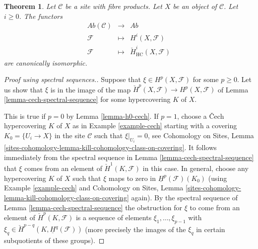 \documentclass{stacks-project}
\theoremstyle{plain}
\newtheorem{theorem}[subsection]{Theorem}
\theoremstyle{definition}
\theoremstyle{remark}
\numberwithin{equation}{subsection}
\begin{document}
\begin{theorem}
\label{theorem-cohomology-hypercoverings}
Let $\mathcal{C}$ be a site with fibre products.
Let $X$ be an object of $\mathcal{C}$. Let $i \geq 0$.
The functors
\begin{eqnarray*}
\textit{Ab}(\mathcal{C}) & \longrightarrow & \textit{Ab} \\
\mathcal{F} & \longmapsto & H^i(X, \mathcal{F}) \\
\mathcal{F} & \longmapsto & \check{H}^i_{\text{HC}}(X, \mathcal{F})
\end{eqnarray*}
are canonically isomorphic.
\end{theorem}

\begin{proof}[Proof using spectral sequences.]
Suppose that $\xi \in H^p(X, \mathcal{F})$ for some $p \geq 0$.
Let us show that $\xi$ is in the image of the map
$\check{H}^p(X, \mathcal{F}) \to H^p(X, \mathcal{F})$ of
Lemma \ref{lemma-cech-spectral-sequence}
for some hypercovering $K$ of $X$.

\medskip\noindent
This is true if $p = 0$ by Lemma \ref{lemma-h0-cech}.
If $p = 1$, choose a {\v C}ech hypercovering $K$ of $X$ as in
Example \ref{example-cech} starting with a covering
$K_0 = \{U_i \to X\}$ in the site $\mathcal{C}$ such that
$\xi|_{U_i} = 0$, see
Cohomology on Sites,
Lemma \ref{sites-cohomology-lemma-kill-cohomology-class-on-covering}.
It follows immediately from the spectral sequence
in Lemma \ref{lemma-cech-spectral-sequence} that $\xi$ comes
from an element of $\check{H}^1(K, \mathcal{F})$ in this case.
In general, choose any hypercovering $K$ of $X$ such
that $\xi$ maps to zero in $\underline{H}^p(\mathcal{F})(K_0)$
(using Example \ref{example-cech} and
Cohomology on Sites,
Lemma \ref{sites-cohomology-lemma-kill-cohomology-class-on-covering}
again).
By the spectral sequence of Lemma \ref{lemma-cech-spectral-sequence}
the obstruction for $\xi$ to come from an element of
$\check{H}^p(K, \mathcal{F})$ is a sequence of elements
$\xi_1, \ldots, \xi_{p - 1}$ with
$\xi_q \in \check{H}^{p - q}(K, \underline{H}^q(\mathcal{F}))$
(more precisely the images of the $\xi_q$ in certain subquotients
of these groups).


\end{proof}
\end{document}

